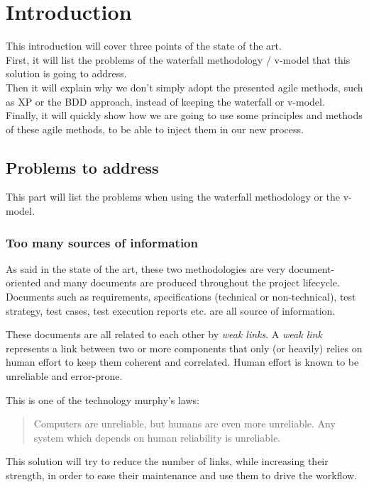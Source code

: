 \section{Introduction}\label{sec:introduction}

This introduction will cover three points of the state of the art. \\
First, it will list the problems of the waterfall methodology / v-model
that this solution is going to address. \\
Then it will explain why we don't simply adopt the presented agile methods, such
as XP or the BDD approach, instead of keeping the waterfall or v-model. \\
Finally, it will quickly show how we are going to use some principles and
methods of these agile methods, to be able to inject them in our new process.

\subsection{Problems to address}\label{subsec:problems-to-address}

This part will list the problems when using the waterfall methodology or the
v-model.

\subsubsection{Too many sources of information}
As said in the state of the art, these two methodologies are very
document-oriented and many documents are produced throughout the project
lifecycle.
Documents such as requirements, specifications (technical or non-technical),
test strategy, test cases, test execution reports etc.
are all source of information.

These documents are all related to each other by \textit{weak links}.
A \textit{weak link} represents a link between two or more components that
only (or heavily) relies on human effort to keep them coherent and correlated.
Human effort is known to be unreliable and error-prone.

This is one of the technology murphy's laws:
\begin{quote}
    Computers are unreliable, but humans are even more unreliable.
    Any system which depends on human reliability is unreliable.
\end{quote}

This solution will try to reduce the number of links, while increasing their
strength, in order to ease their maintenance and use them to drive the
workflow.

